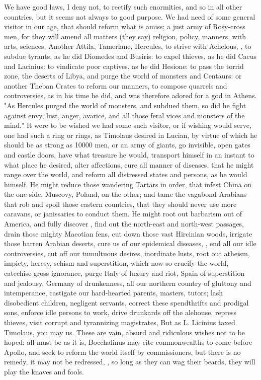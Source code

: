 We have good laws, I deny not, to rectify such enormities, and so in all other
countries, but it seems not always to good purpose. We had need of some general
visitor in our age, that should reform what is amiss; a just army of Rosy-cross
men, for they will amend all matters (they say) religion, policy, manners, with
arts, sciences, \etc{} Another Attila, Tamerlane, Hercules, to strive with
Achelous, , to subdue tyrants, as
he did Diomedes and Busiris: to expel thieves, as he did
Cacus and Lacinius: to vindicate poor captives, as he did Hesione: to pass the
torrid zone, the deserts of Libya, and purge the world of monsters and
Centaurs: or another Theban Crates to reform our manners, to compose quarrels
and controversies, as in his time he did, and was therefore adored for a god in
Athens. "As Hercules purged the world of monsters, and
subdued them, so did he fight against envy, lust, anger, avarice, \etc{} and
all those feral vices and monsters of the mind." It were to be wished we had
some such visitor, or if wishing would serve, one had such a ring or rings, as
Timolaus desired in Lucian, by virtue of which he should be
as strong as 10\thinspace{}000 men, or an army of giants, go invisible, open
gates and castle doors, have what treasure he would, transport himself in an
instant to what place he desired, alter affections, cure all manner of
diseases, that he might range over the world, and reform all distressed states
and persons, as he would himself. He might reduce those wandering Tartars in
order, that infest China on the one side, Muscovy, Poland, on the other; and
tame the vagabond Arabians that rob and spoil those eastern countries, that
they should never use more caravans, or janissaries to conduct them. He might
root out barbarism out of America, and fully discover , find out the north-east and north-west passages, drain those mighty
Maeotian fens, cut down those vast Hircinian woods, irrigate those barren
Arabian deserts, \etc{} cure us of our epidemical diseases, , \etc{} end all our idle controversies, cut off our
tumultuous desires, inordinate lusts, root out atheism, impiety, heresy, schism
and superstition, which now so crucify the world, catechise gross ignorance,
purge Italy of luxury and riot, Spain of superstition and jealousy, Germany of
drunkenness, all our northern country of gluttony and intemperance, castigate
our hard-hearted parents, masters, tutors; lash disobedient children, negligent
servants, correct these spendthrifts and prodigal sons, enforce idle persons to
work, drive drunkards off the alehouse, repress thieves, visit corrupt and
tyrannizing magistrates, \etc{} But as L. Licinius taxed Timolaus, you may us.
These are vain, absurd and ridiculous wishes not to be hoped: all must be as it
is, Bocchalinus may cite commonwealths to come before
Apollo, and seek to reform the world itself by commissioners, but there is no
remedy, it may not be redressed, , so long as they can wag their beards, they will play the
knaves and fools.

